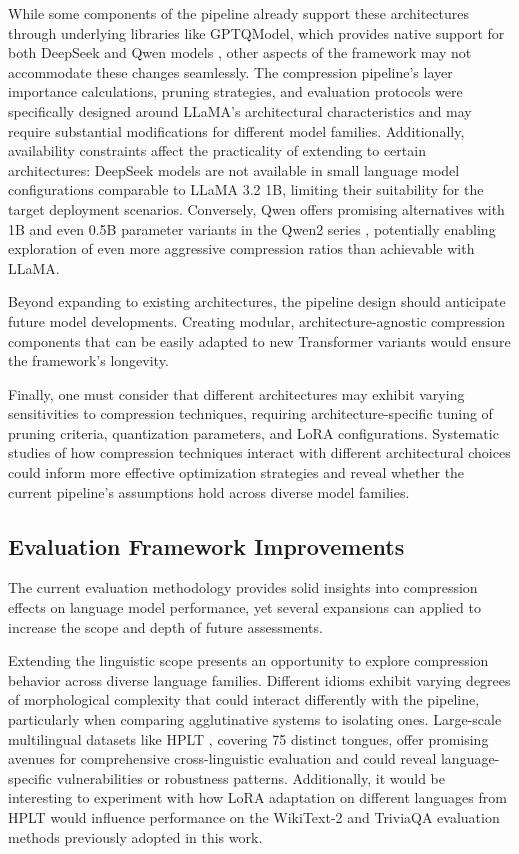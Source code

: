 While some components of the pipeline already support these architectures through underlying libraries like GPTQModel, which provides native support for both DeepSeek and Qwen models \cite{gptqmodel}, other aspects of the framework may not accommodate these changes seamlessly. The compression pipeline's layer importance calculations, pruning strategies, and evaluation protocols were specifically designed around LLaMA's architectural characteristics and may require substantial modifications for different model families. Additionally, availability constraints affect the practicality of extending to certain architectures: DeepSeek models are not available in small language model configurations comparable to LLaMA 3.2 1B, limiting their suitability for the target deployment scenarios. Conversely, Qwen offers promising alternatives with 1B and even 0.5B parameter variants in the Qwen2 series \cite{qwen2}, potentially enabling exploration of even more aggressive compression ratios than achievable with LLaMA.

Beyond expanding to existing architectures, the pipeline design should anticipate future model developments. Creating modular, architecture-agnostic compression components that can be easily adapted to new Transformer variants would ensure the framework's longevity.

Finally, one must consider that different architectures may exhibit varying sensitivities to compression techniques, requiring architecture-specific tuning of pruning criteria, quantization parameters, and LoRA configurations. Systematic studies of how compression techniques interact with different architectural choices could inform more effective optimization strategies and reveal whether the current pipeline's assumptions hold across diverse model families.

\subsection{Evaluation Framework Improvements}

The current evaluation methodology provides solid insights into compression effects on language model performance, yet several expansions can applied to increase the scope and depth of future assessments.

Extending the linguistic scope presents an opportunity to explore compression behavior across diverse language families. Different idioms exhibit varying degrees of morphological complexity that could interact differently with the pipeline, particularly when comparing agglutinative systems to isolating ones. Large-scale multilingual datasets like HPLT \cite{hplt}, covering 75 distinct tongues, offer promising avenues for comprehensive cross-linguistic evaluation and could reveal language-specific  vulnerabilities or robustness patterns. Additionally, it would be interesting to experiment with how LoRA adaptation on different languages from HPLT would influence performance on the WikiText-2 and TriviaQA evaluation methods previously adopted in this work.


